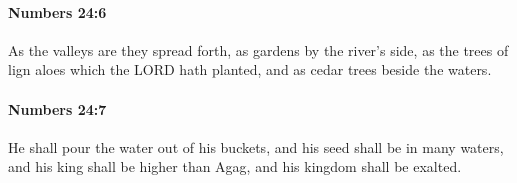 		\paragraph{Numbers 24:6} %
			\label{NUMBERS-24-6}

			As the valleys are they spread forth, as gardens by the river’s side, as the trees of lign aloes which the LORD hath planted, and as cedar trees beside the waters.


		\paragraph{Numbers 24:7} %
			\label{NUMBERS-24-7}

			He shall pour the water out of his buckets, and his seed shall be in many waters, and his king shall be higher than Agag, and his kingdom shall be exalted.


